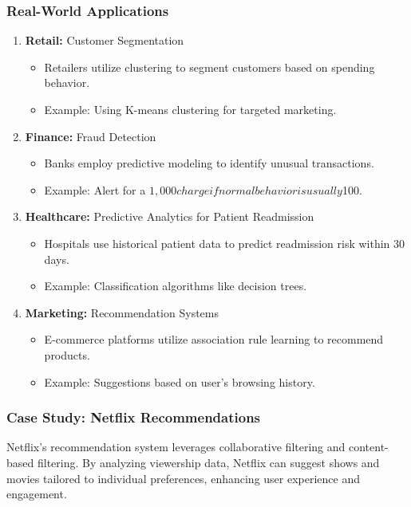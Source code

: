 \documentclass[aspectratio=169]{beamer}
\begin{document}
\begin{frame}[fragile]
    \frametitle{Real-World Applications}
    
    \begin{enumerate}
        \item \textbf{Retail:} Customer Segmentation
            \begin{itemize}
                \item Retailers utilize clustering to segment customers based on spending behavior. 
                \item Example: Using K-means clustering for targeted marketing.
            \end{itemize}
        \item \textbf{Finance:} Fraud Detection
            \begin{itemize}
                \item Banks employ predictive modeling to identify unusual transactions.
                \item Example: Alert for a $1,000 charge if normal behavior is usually $100.
            \end{itemize}
        \item \textbf{Healthcare:} Predictive Analytics for Patient Readmission
            \begin{itemize}
                \item Hospitals use historical patient data to predict readmission risk within 30 days.
                \item Example: Classification algorithms like decision trees.
            \end{itemize}
        \item \textbf{Marketing:} Recommendation Systems
            \begin{itemize}
                \item E-commerce platforms utilize association rule learning to recommend products.
                \item Example: Suggestions based on user’s browsing history.
            \end{itemize}
    \end{enumerate}
\end{frame}

\begin{frame}[fragile]
    \frametitle{Case Study: Netflix Recommendations}
    
    Netflix's recommendation system leverages collaborative filtering and content-based filtering. By analyzing viewership data, Netflix can suggest shows and movies tailored to individual preferences, enhancing user experience and engagement.
\end{frame}
\end{document}
